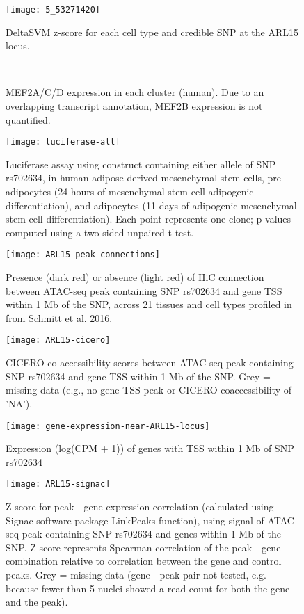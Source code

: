 \documentclass{article}
\begin{document}
\begin{figure}
	\texttt{[image: 5\_53271420]}
	\caption{DeltaSVM z-score for each cell type and credible SNP at the ARL15 locus.}
\end{figure}


\begin{figure}
	\\
	\caption{MEF2A/C/D expression in each cluster (human). Due to an overlapping transcript annotation, MEF2B expression is not quantified.}
\end{figure} 


\begin{figure}
	\texttt{[image: luciferase-all]}
	\caption{Luciferase assay using construct containing either allele of SNP rs702634, in human adipose-derived mesenchymal stem cells, pre-adipocytes (24 hours of mesenchymal stem cell adipogenic differentiation), and adipocytes (11 days of adipogenic mesenchymal stem cell differentiation). Each point represents one clone; p-values computed using a two-sided unpaired t-test.}
\end{figure}

\begin{figure}
	\texttt{[image: ARL15\_peak-connections]}
	\caption{Presence (dark red) or absence (light red) of HiC connection between ATAC-seq peak containing SNP rs702634 and gene TSS within 1 Mb of the SNP, across 21 tissues and cell types profiled in from Schmitt et al. 2016.}
\end{figure}

\begin{figure}
	\texttt{[image: ARL15-cicero]}
	\caption{CICERO co-accessibility scores between ATAC-seq peak containing SNP rs702634 and gene TSS within 1 Mb of the SNP. Grey = missing data (e.g., no gene TSS peak or CICERO coaccessibility of 'NA').}
\end{figure}

\begin{figure}
	\texttt{[image: gene-expression-near-ARL15-locus]}
	\caption{Expression (log(CPM + 1)) of genes with TSS within 1 Mb of SNP rs702634}
\end{figure}

\begin{figure}
	\texttt{[image: ARL15-signac]}
	\caption{Z-score for peak - gene expression correlation (calculated using Signac software package LinkPeaks function), using signal of ATAC-seq peak containing SNP rs702634 and genes within 1 Mb of the SNP. Z-score represents Spearman correlation of the peak - gene combination relative to correlation between the gene and control peaks. Grey = missing data (gene - peak pair not tested, e.g. because fewer than 5 nuclei showed a read count for both the gene and the peak).}
\end{figure}
\end{document}
